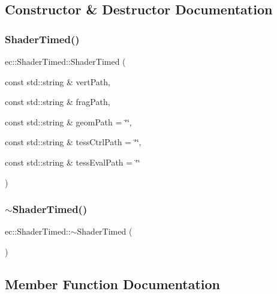 \subsection{Constructor \& Destructor Documentation}
\mbox{\label{classec_1_1_shader_timed_ae02144800facf155732c2c38d8d64297}} 
\subsubsection{\texorpdfstring{Shader\+Timed()}{ShaderTimed()}}
{\footnotesize\ttfamily ec\+::\+Shader\+Timed\+::\+Shader\+Timed (\begin{DoxyParamCaption}\item[{const std\+::string \&}]{vert\+Path,  }\item[{const std\+::string \&}]{frag\+Path,  }\item[{const std\+::string \&}]{geom\+Path = {\ttfamily \char`\"{}\char`\"{}},  }\item[{const std\+::string \&}]{tess\+Ctrl\+Path = {\ttfamily \char`\"{}\char`\"{}},  }\item[{const std\+::string \&}]{tess\+Eval\+Path = {\ttfamily \char`\"{}\char`\"{}} }\end{DoxyParamCaption})\hspace{0.3cm}{\ttfamily [explicit]}}

\mbox{\label{classec_1_1_shader_timed_aa0f0ed52039ab46266010bcf9c2131fb}} 
\subsubsection{\texorpdfstring{$\sim$\+Shader\+Timed()}{~ShaderTimed()}}
{\footnotesize\ttfamily ec\+::\+Shader\+Timed\+::$\sim$\+Shader\+Timed (\begin{DoxyParamCaption}{ }\end{DoxyParamCaption})\hspace{0.3cm}{\ttfamily [default]}}



\subsection{Member Function Documentation}
\mbox{\label{classec_1_1_shader_timed_abaeaa76b098bc4602075da0ad8b7284a}} 

